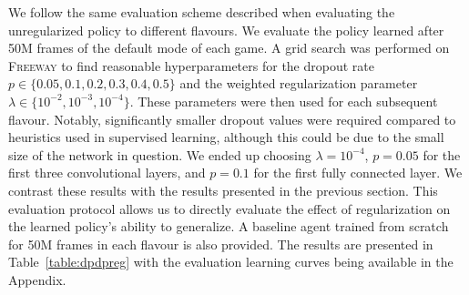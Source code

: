 \documentclass{article}
\begin{document}
We follow the same evaluation scheme described when evaluating the unregularized policy to different flavours. We evaluate the policy learned after 50M frames of the default mode of each game.
A grid search was performed on \textsc{Freeway} to find reasonable hyperparameters for the dropout rate $p \in \{ 0.05, 0.1, 0.2, 0.3, 0.4, 0.5 \}$ and the weighted regularization parameter $\lambda \in \{ 10^{-2}, 10^{-3}, 10^{-4} \}$. These parameters were then used for each subsequent flavour. Notably, significantly smaller dropout values were required compared to heuristics used in supervised learning, although this could be due to the small size of the network in question. We ended up choosing $\lambda = 10^{-4}$, $p=0.05$ for the first three convolutional layers, and $p=0.1$ for the first fully connected layer.
We contrast these results with the results presented in the previous section. This evaluation protocol allows us to directly evaluate the effect of regularization on the learned policy's ability to generalize. A baseline agent trained from scratch for 50M frames in each flavour is also provided. The results are presented in Table~\ref{table:dpdpreg} with the evaluation learning curves being available in the Appendix.
\end{document}
